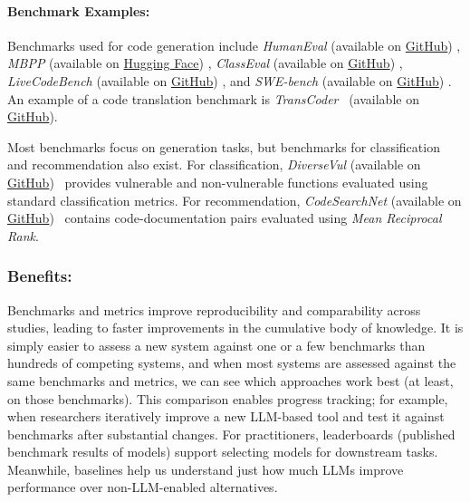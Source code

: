 \documentclass[smallextended]{svjour3}
\newcommand{\guidelinesubsubsection}[1]{\subsubsection{\bfseries #1:}}
\newcommand{\guidelinesubsubsection}[1]{\subsubsection{#1}}
\begin{document}
\paragraph{Benchmark Examples:}

Benchmarks used for code generation include \emph{HumanEval} (available on \href{https://github.com/openai/human-eval}{GitHub}) \cite{DBLP:journals/corr/abs-2107-03374}, \emph{MBPP} (available on \href{https://huggingface.co/datasets/google-research-datasets/mbpp}{Hugging Face}) \cite{DBLP:journals/corr/abs-2108-07732},
\emph{ClassEval} (available on \href{https://github.com/FudanSELab/ClassEval}{GitHub}) \cite{DBLP:journals/corr/abs-2308-01861}, \emph{LiveCodeBench} (available on \href{https://github.com/LiveCodeBench/LiveCodeBench}{GitHub}) \cite{DBLP:journals/corr/abs-2403-07974}, and \emph{SWE-bench} (available on \href{https://github.com/swe-bench/SWE-bench}{GitHub}) \cite{DBLP:conf/iclr/JimenezYWYPPN24}.
An example of a code translation benchmark is \emph{TransCoder}~\cite{DBLP:conf/nips/RoziereLCL20} (available on \href{https://github.com/facebookresearch/CodeGen}{GitHub}). 

Most benchmarks focus on generation tasks, but benchmarks for classification and recommendation also exist.
For classification, \emph{DiverseVul} (available on \href{https://github.com/wagner-group/diversevul}{GitHub})~\cite{DBLP:conf/raid/0001DACW23} provides vulnerable and non-vulnerable functions evaluated using standard classification metrics.
For recommendation, \emph{CodeSearchNet} (available on \href{https://github.com/github/CodeSearchNet}{GitHub})~\cite{DBLP:journals/corr/abs-1909-09436} contains code-documentation pairs evaluated using \emph{Mean Reciprocal Rank}.

\guidelinesubsubsection{Benefits}

Benchmarks and metrics improve reproducibility and comparability across studies, leading to faster improvements in the cumulative body of knowledge. It is simply easier to assess a new system against one or a few benchmarks than hundreds of competing systems, and when most systems are assessed against the same benchmarks and metrics, we can see which approaches work best (at least, on those benchmarks). This comparison enables progress tracking; for example, when researchers iteratively improve a new LLM-based tool and test it against benchmarks after substantial changes. For practitioners, leaderboards (published benchmark results of models) support selecting models for downstream tasks. Meanwhile, baselines help us understand just how much LLMs improve performance over non-LLM-enabled alternatives. 
\end{document}
